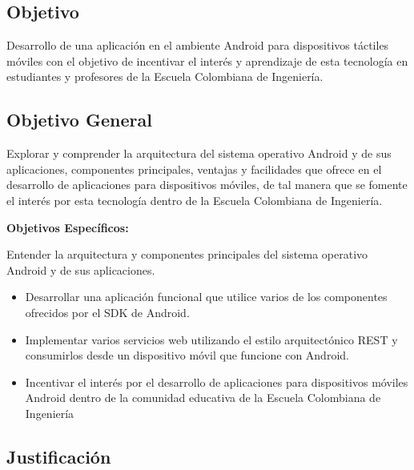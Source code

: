 \documentclass[letterpaper,12pt]{book}
\newcommand{\fnz}{\footnotesize}
\begin{document}
\begin{mainmatter}
 \pagestyle{fancyplain}
 \lhead[\fancyplain{}{}]
       {\fancyplain{}{\fnz{\rightmark}}}
 \rhead[\fancyplain{}{\fnz{\rightmark}}]
       {\fancyplain{}{}}

\chapter{Objetivo}

Desarrollo de una aplicación  en el ambiente Android para dispositivos
táctiles móviles con  el objetivo de  incentivar el interés y  aprendizaje de esta
tecnología en  estudiantes  y  profesores  de la  Escuela
Colombiana de Ingeniería.

\section{Objetivo General}
Explorar y comprender la  arquitectura del sistema operativo Android y
de sus  aplicaciones, componentes principales,  ventajas y facilidades
que  ofrece  en  el   desarrollo  de  aplicaciones  para  dispositivos
móviles,  de tal manera
que se  fomente el  interés por esta  tecnología dentro de  la Escuela
Colombiana de Ingeniería.

\textbf{Objetivos Específicos:}

Entender la arquitectura y componentes principales del sistema operativo Android y de sus aplicaciones.
\begin{itemize}

\item Desarrollar una aplicación funcional que utilice varios de los componentes ofrecidos por el SDK de Android.

\item Implementar varios servicios web utilizando el estilo arquitectónico REST 
y consumirlos desde un dispositivo móvil que funcione con  Android.

\item Incentivar el interés por el desarrollo de aplicaciones para dispositivos móviles  
Android dentro de la comunidad educativa de la Escuela Colombiana de Ingeniería
\end{itemize}

\section{Justificación}


\end{mainmatter}
\end{document}
